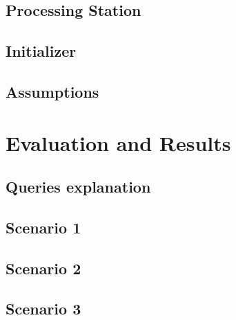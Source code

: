 \documentclass[11pt, oneside]{article}
\begin{document}
\subsection{Processing Station}
\subsection{Initializer}
\subsection{Assumptions}

\section{Evaluation and Results}
\subsection{Queries explanation}
\subsection{Scenario 1}
\subsection{Scenario 2}
\subsection{Scenario 3}

\end{document}
